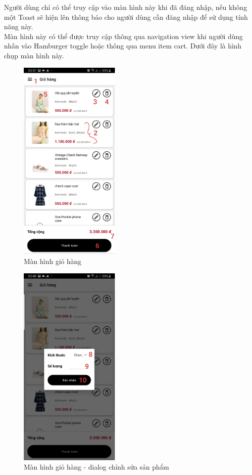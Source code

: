 \documentclass[12pt]{article}
\begin{document}
\indent Người dùng chỉ có thể truy cập vào màn hình này khi đã đăng nhập, nếu không một Toast sẽ hiện lên thông báo cho người dùng cần đăng nhập để sử dụng tính năng này.\\

\indent Màn hình này có thể được truy cập thông qua navigation view khi người dùng nhấn vào Hamburger toggle hoặc thông qua menu item cart. Dưới đây là hình chụp màn hình này.

\begin{figure}[H]
    \centering
    \includegraphics[height=10cm]{images/27.png}
    \caption{Màn hình giỏ hàng}
\end{figure}

\begin{figure}[H]
    \centering
    \includegraphics[height=10cm]{images/28.png}
    \caption{Màn hình giỏ hàng - dialog chỉnh sửa sản phẩm}
\end{figure}
\end{document}
